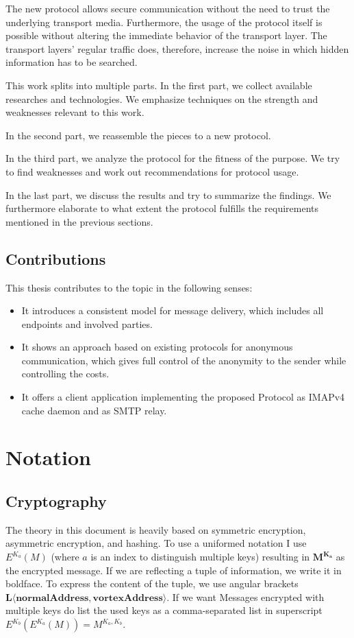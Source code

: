 The new protocol allows secure communication without the need to trust the underlying transport media. Furthermore, the usage of the protocol itself is possible without altering the immediate behavior of the transport layer. The transport layers' regular traffic does, therefore, increase the noise in which hidden information has to be searched. 

This work splits into multiple parts. In the first part, we collect available researches and technologies. We emphasize techniques on the strength and weaknesses relevant to this work. 

In the second part, we reassemble the pieces to a new protocol. 

In the third part, we analyze the protocol for the fitness of the purpose. We try to find weaknesses and work out recommendations for protocol usage. 

In the last part, we discuss the results and try to summarize the findings. We furthermore elaborate to what extent the protocol fulfills the requirements mentioned in the previous sections.

\section{Contributions}
This thesis contributes to the topic in the following senses:
\begin{itemize}
	\item It introduces a consistent model for message delivery, which includes all endpoints and involved parties.
	\item It shows an approach based on existing protocols for anonymous communication, which gives full control of the anonymity to the sender while controlling the costs.
	\item It offers a client application implementing the proposed Protocol as IMAPv4 cache daemon and as SMTP relay.
\end{itemize}

\chapter{Notation}
\section{Cryptography \label{sec:encNot}}
The theory in this document is heavily based on symmetric encryption, asymmetric encryption, and hashing. To use a uniformed notation I use $E^{K_a}(M)$ (where $a$ is an index to distinguish multiple keys) resulting in $\mathbf{M^{K_a}}$ as the encrypted message. If we are reflecting a tuple of information, we write it in boldface. To express the content of the tuple, we use angular brackets $\mathbf{L\langle normalAddress,vortexAddress\rangle }$. If we want Messages encrypted with multiple keys do list the used keys as a comma-separated list in superscript $E^{K_b}\left(E^{K_a}\left(M\right)\right)=M^{{K_{a}},{K_b}}$.

